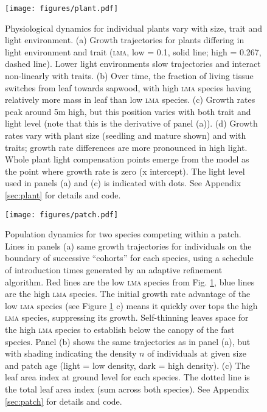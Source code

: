 \documentclass[a4paper,11pt]{article}
\begin{document}
\newpage

\begin{figure}[h!]
\centering
\texttt{[image: figures/plant.pdf]}
\caption{Physiological dynamics for individual plants vary with size, trait
and light environment. (a) Growth trajectories for plants differing in light
environment and trait (\textsc{lma}, low = 0.1, solid line; high =  0.267, dashed
line). Lower light environments slow trajectories and interact non-linearly
with traits. (b) Over time, the fraction of living tissue switches from leaf
towards sapwood, with high \textsc{lma} species having relatively more mass in leaf
than low \textsc{lma} species. (c) Growth rates peak around 5m high, but this position
varies with both trait and light level (note that this is the derivative of
panel (a)). (d) Growth rates vary with plant size (seedling and mature shown)
and with traits; growth rate differences are more pronounced in high light.
Whole plant light compensation points emerge from the model as the point where
growth rate is zero (x intercept).  The light level used in panels (a) and (c)
is indicated with dots.  See Appendix \ref{sec:plant} for details and code.}
\label{fig:plant}
\end{figure}

\newpage

\begin{figure}[h!]
\centering
\texttt{[image: figures/patch.pdf]}
\caption{Population dynamics for two species competing within a patch. Lines
in panels (a) same growth trajectories for individuals on the
boundary of successive ``cohorts'' for each species, using a schedule of 
introduction times generated by an adaptive refinement algorithm.
 Red lines are the low \textsc{lma}
species from Fig. \ref{fig:plant}, blue lines are the high \textsc{lma} species.  The
initial growth rate advantage of the low \textsc{lma} species (see Figure
\ref{fig:plant} c) means it quickly over tops the high \textsc{lma} species,
suppressing its growth.  Self-thinning leaves space for the high \textsc{lma} species
to establish below the canopy of the fast species. Panel (b) shows the same
trajectories as in panel (a), but with shading indicating the density $n$ of
individuals at given size and patch age (light = low density, dark = high density).  
(c) The leaf area index at ground
level for each species.  The dotted line is the total leaf area index (sum
across both species). See Appendix \ref{sec:patch} for details and code.}
\label{fig:patch}
\end{figure}
\end{document}
